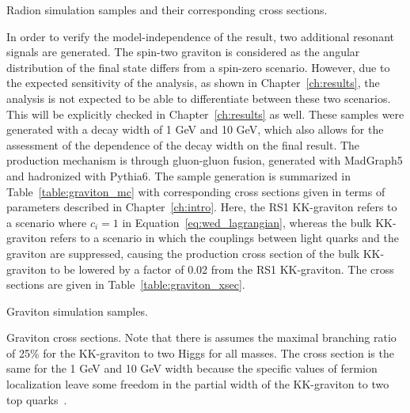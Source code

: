 \begin{table}[ht]
  \centering
  \renewcommand{\arraystretch}{1.4}
  \caption{Radion simulation samples and their corresponding cross sections.}
  
  \label{table:radion_mc}
\end{table}

In order to verify the model-independence of the result, two additional resonant signals
are generated.
The spin-two graviton is considered as the angular distribution of the final state differs from a
spin-zero scenario. However, due to the expected sensitivity of the analysis, as shown in
Chapter~\ref{ch:results}, the analysis is not expected to be able to differentiate between
these two scenarios. This will be explicitly checked in Chapter~\ref{ch:results} as well.
These samples were generated with a decay width of 1 GeV and 10 GeV,
which also allows for the assessment of the
dependence of the decay width on the final result. The production mechanism is through
gluon-gluon fusion, generated with MadGraph5 and hadronized with Pythia6. The sample generation
is summarized in Table~\ref{table:graviton_mc} with corresponding cross sections given in terms of
parameters described in Chapter~\ref{ch:intro}. Here, the RS1 KK-graviton refers to a scenario
where $c_i = 1$ in Equation~\ref{eq:wed_lagrangian}, whereas the bulk KK-graviton refers to a scenario
in which the couplings between light quarks and the graviton are suppressed, causing the
production cross section of the bulk KK-graviton to be lowered by a factor of 0.02 from the
RS1 KK-graviton. The cross sections are given in Table~\ref{table:graviton_xsec}.

\begin{table}[ht]
  \centering
  \renewcommand{\arraystretch}{1.4}
  \caption{Graviton simulation samples.}
  
  \label{table:graviton_mc}
\end{table}

\begin{table}[ht]
  \centering
  \renewcommand{\arraystretch}{1.4}
  \caption{Graviton cross sections. Note that there is assumes the maximal
branching ratio of 25\% for the KK-graviton to two Higgs for all masses. The cross section is the
same for the 1 GeV and 10 GeV width because the specific values of fermion localization leave some
freedom in the partial width of the KK-graviton to two top quarks~\cite{Agashe:2007zd}.}
  
  \label{table:graviton_xsec}
\end{table}


